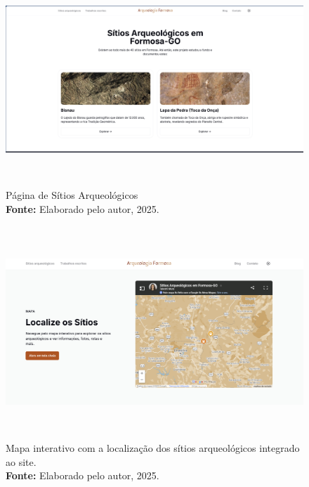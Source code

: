 \begin{figure}[H]
    \centering
    \includegraphics[height=8cm, keepaspectratio]{img/site/sitios arqueologicos.png}
    \caption{Página de Sítios Arqueológicos \\
    \textbf{Fonte:} Elaborado pelo autor, 2025.}
    \label{fig:pagina_sitiosarqueologicos}
\end{figure}

\begin{figure}[H]
    \centering
    \includegraphics[height=8cm, keepaspectratio]{img/site/localize os sitios.png}
    \caption{ Mapa interativo com a localização dos sítios arqueológicos integrado ao site. \\
        \textbf{Fonte:} Elaborado pelo autor, 2025.}
    \label{fig:localize os sitios}
\end{figure}


